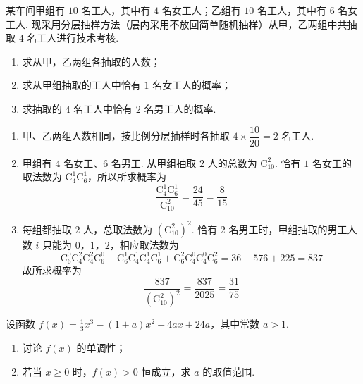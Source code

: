 \begin{problem}
某车间甲组有 \(10\text{ 名}\)工人，其中有 \(4\text{ 名}\)女工人；乙组有 \(10\text{ 名}\)工人，其中有 \(6\text{ 名}\)女工人. 现采用分层抽样方法（层内采用不放回简单随机抽样）从甲，乙两组中共抽取 \(4\text{ 名}\)工人进行技术考核.

\begin{enumerate}
\item 求从甲，乙两组各抽取的人数；
\item 求从甲组抽取的工人中恰有 \(1\text{ 名}\)女工人的概率；
\item 求抽取的 \(4\text{ 名}\)工人中恰有 \(2\text{ 名}\)男工人的概率.
\end{enumerate}
\end{problem}

\begin{solution}
\begin{enumerate}
\item 甲、乙两组人数相同，按比例分层抽样时各抽取
\(4\times\dfrac{10}{20}=2\) 名工人.
\item 甲组有 \(4\) 名女工、\(6\) 名男工. 从甲组抽取
\(2\) 人的总数为 \(\mathrm C_{10}^2\). 恰有 \(1\) 名女工的取法数为
\(\mathrm C_4^1\mathrm C_6^1\)，所以所求概率为
\[
\frac{\mathrm C_4^1\mathrm C_6^1}{\mathrm C_{10}^2}
=\frac{24}{45}=\frac8{15}
\]
\item 每组都抽取 \(2\) 人，总取法数为
\(\left(\mathrm C_{10}^2\right)^2\). 恰有 \(2\) 名男工时，甲组抽取的男工人数
\(i\) 只能为 \(0\)，\(1\)，\(2\)，相应取法数为
\[
\mathrm C_6^0\mathrm C_4^2\mathrm C_4^2\mathrm C_6^0
+\mathrm C_6^1\mathrm C_4^1\mathrm C_4^1\mathrm C_6^1
+\mathrm C_6^2\mathrm C_4^0\mathrm C_4^0\mathrm C_6^2
=36+576+225=837
\]
故所求概率为
\[
\frac{837}{\left(\mathrm C_{10}^2\right)^2}
=\frac{837}{2025}=\frac{31}{75}
\]
\end{enumerate}
\end{solution}

\begin{problem}
设函数 \( f(x) = \frac{1}{3} x^3 - (1 + a)x^2 + 4ax + 24a \)，其中常数 \( a > 1 \).

\begin{enumerate}
\item 讨论 \( f(x) \) 的单调性；
\item 若当 \(x \geqslant 0\) 时，\(f(x) > 0\) 恒成立，求 \(a\) 的取值范围.
\end{enumerate}
\end{problem}

